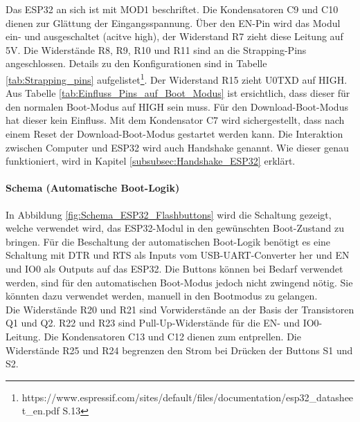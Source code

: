 Das ESP32 an sich ist mit MOD1 beschriftet. Die Kondensatoren C9 und C10 dienen zur Glättung der Eingangsspannung. Über den EN-Pin wird das Modul ein- und ausgeschaltet (acitve high), der Widerstand R7 zieht diese Leitung auf 5V. Die Widerstände R8, R9, R10 und R11 sind an die Strapping-Pins angeschlossen.
Details zu den Konfigurationen sind in Tabelle \ref{tab:Strapping_pins} aufgelistet\footnote{https://www.espressif.com/sites/default/files/documentation/esp32\_datasheet\_en.pdf S.13}. Der Widerstand R15 zieht U0TXD auf HIGH. Aus Tabelle \ref{tab:Einfluss_Pins_auf_Boot_Modus} ist ersichtlich, dass dieser für den normalen Boot-Modus auf HIGH sein muss. Für den Download-Boot-Modus hat dieser kein Einfluss. Mit dem Kondensator C7 wird sichergestellt, dass nach einem Reset der Download-Boot-Modus gestartet werden kann. Die Interaktion zwischen Computer und ESP32 wird auch Handshake genannt. Wie dieser genau funktioniert, wird in Kapitel \ref{subsubsec:Handshake_ESP32} erklärt.


\paragraph{Schema (Automatische Boot-Logik)}\mbox{}

In Abbildung \ref{fig:Schema_ESP32_Flashbuttons} wird die Schaltung gezeigt, welche verwendet wird, das ESP32-Modul in den gewünschten Boot-Zustand zu bringen. Für die Beschaltung der automatischen Boot-Logik benötigt es eine Schaltung mit DTR und RTS als Inputs vom USB-UART-Converter her und EN und IO0 als Outputs auf das ESP32. Die Buttons können bei Bedarf verwendet werden, sind für den automatischen Boot-Modus jedoch nicht zwingend nötig. Sie könnten dazu verwendet werden, manuell in den Bootmodus zu gelangen.\\
Die Widerstände R20 und R21 sind Vorwiderstände an der Basis der Transistoren Q1 und Q2. R22 und R23 sind Pull-Up-Widerstände für die EN- und IO0-Leitung. Die Kondensatoren C13 und C12 dienen zum entprellen. Die Widerstände R25 und R24 begrenzen den Strom bei Drücken der Buttons S1 und S2.

